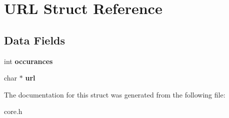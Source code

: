 \hypertarget{struct_u_r_l}{\section{U\-R\-L Struct Reference}
\label{struct_u_r_l}
}
\subsection*{Data Fields}
\begin{DoxyCompactItemize}
\item 
\hypertarget{struct_u_r_l_a86c6b1a5be1bda86033030e89b36c0c5}{int {\bfseries occurances}}\label{struct_u_r_l_a86c6b1a5be1bda86033030e89b36c0c5}

\item 
\hypertarget{struct_u_r_l_ab135e5154c1828bef226a3df98ee3333}{char $\ast$ {\bfseries url}}\label{struct_u_r_l_ab135e5154c1828bef226a3df98ee3333}

\end{DoxyCompactItemize}


The documentation for this struct was generated from the following file\-:\begin{DoxyCompactItemize}
\item 
core.\-h\end{DoxyCompactItemize}
